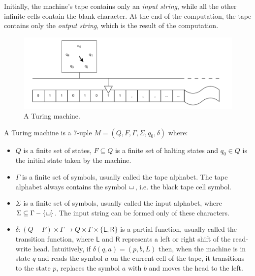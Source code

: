 Initially, the machine's tape contains only an \textit{input string}, while all the other infinite cells contain the blank character. At the end of the computation, the tape contains only the \textit{output string}, which is the result of the computation.

\begin{figure}[H]
    \centering
    \includegraphics[scale=0.75]{resources/images/tm.pdf}

    \caption{A Turing machine.}
\end{figure}

\newpage

\begin{definition}
 A Turing machine is a 7-uple $M = (Q, F, \Gamma, \Sigma, q_0, \delta)$ where:
    \begin{itemize}
        \item $Q$ is a finite set of states, $F \subseteq Q$ is a finite set of halting states and $q_0 \in Q$ is the initial state taken by the machine.
        \item $\Gamma$ is a finite set of symbols, usually called the tape alphabet. The tape alphabet always contains the symbol $\blankchar\,$, i.e. the black tape cell symbol.
        \item $\Sigma$ is a finite set of symbols, usually called the input alphabet, where $\Sigma \subseteq \Gamma - \{\blankchar\}$. The input string can be formed only of these characters.
        \item $\delta : (Q - F) \times \Gamma \to Q \times \Gamma \times \{\mathsf{L}, \mathsf{R}\}$ is a partial function, usually called the transition function, where $\mathsf{L}$ and $\mathsf{R}$ represents a left or right shift of the read-write head. Intuitively, if $\delta(q, a) = (p, b, L)$ then, when the machine is in state $q$ and reads the symbol $a$ on the current cell of the tape, it transitions to the state $p$, replaces the symbol $a$ with $b$ and moves the head to the left.
    \end{itemize}
\end{definition}


